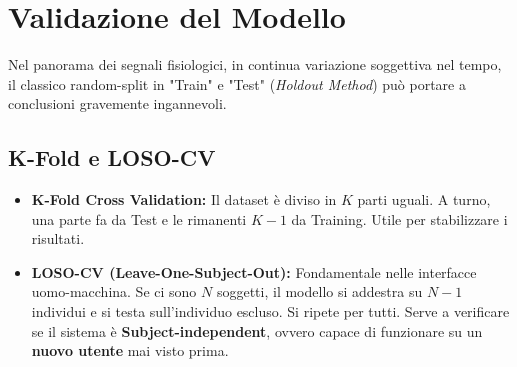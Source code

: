 \vspace{0.3cm}
\noindent
{}
\vspace{0.3cm}

\section{Validazione del Modello}
Nel panorama dei segnali fisiologici, in continua variazione soggettiva nel tempo, il classico random-split in "Train" e "Test" (\textit{Holdout Method}) può portare a conclusioni gravemente ingannevoli.

\subsection{K-Fold e LOSO-CV}
\begin{itemize}
    \item \textbf{K-Fold Cross Validation:} Il dataset è diviso in $K$ parti uguali.
    A turno, una parte fa da Test e le rimanenti $K-1$ da Training.
    Utile per stabilizzare i risultati.
    \item \textbf{LOSO-CV (Leave-One-Subject-Out):} Fondamentale nelle interfacce uomo-macchina.
    Se ci sono $N$ soggetti, il modello si addestra su $N-1$ individui e si testa sull'individuo escluso.
    Si ripete per tutti.
    Serve a verificare se il sistema è \textbf{Subject-independent}, ovvero capace di funzionare su un \textbf{nuovo utente} mai visto prima.
\end{itemize}

